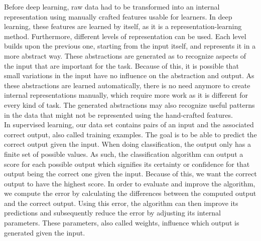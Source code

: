 \documentclass[a4paper, 11pt]{article}
\begin{document}
Before deep learning, raw data had to be transformed into an internal representation using manually crafted features usable for learners. In deep learning, these features are learned by itself, as it is a representation-learning method. Furthermore, different levels of representation can be used. Each level builds upon the previous one, starting from the input itself, and represents it in a more abstract way. These abstractions are generated as to recognize aspects of the input that are important for the task. Because of this, it is possible that small variations in the input have no influence on the abstraction and output.
As these abstractions are learned automatically, there is no need anymore to create internal representations manually, which require more work as it is different for every kind of task. The generated abstractions may also recognize useful patterns in the data that might not be represented using the hand-crafted features.\\

In supervised learning, our data set contains pairs of an input and the associated correct output, also called training examples. The goal is to be able to predict the correct output given the input. When doing classification, the output only has a finite set of possible values. As such, the classification algorithm can output a score for each possible output which signifies its certainty or confidence for that output being the correct one given the input. Because of this, we want the correct output to have the highest score.
In order to evaluate and improve the algorithm, we compute the error by calculating the differences between the computed output and the correct output. Using this error, the algorithm can then improve its predictions and subsequently reduce the error by adjusting its internal parameters. These parameters, also called weights, influence which output is generated given the input.\\
\end{document}
